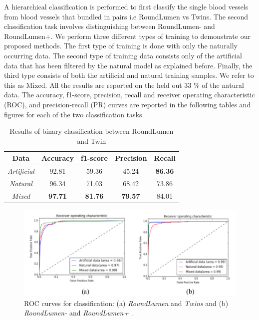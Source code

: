 A hierarchical classification is performed to first classify the single blood vessels from blood vessels that bundled in pairs i.e RoundLumen vs Twins. The second classification task involves distinguishing between RoundLumen- and RoundLumen+. We perform three different types of training to demonstrate our proposed methods. The first type of training is done with only the naturally occurring data. The second type of training data consists only of the artificial data that has been filtered by the natural model as explained before. Finally, the third type consists of both the artificial and natural training samples. We refer to this as Mixed. All the results are reported on the held out 33 \% of the natural data. The accuracy, f1-score, precision, recall and receiver operating characteristic (ROC), and precision-recall (PR) curves are reported in the following tables and figures for each of the two classification tasks. 

\begin{table}[H]
\label{table:results}
\centering
\caption{Results of binary classification between RoundLumen and Twin}
\begin{tabular}{ | c | c | c | c | c |} 
\hline
Data & Accuracy & f1-score & Precision & Recall \\ 
\hline
\textit{Artificial} & 92.81& 59.36	& 45.24 & \textbf{86.36} \\ 
\hline
\textit{Natural} & 96.34& 71.03& 68.42& 73.86 \\
\hline
\textit{Mixed} & \textbf{97.71} & \textbf{81.76} & \textbf{79.57} & 84.01 \\
\hline
\end{tabular}
\end{table}

\begin{figure}[H]
\centering
\includegraphics[width=1.0\textwidth]{img/results}
\caption{ROC curves for classification: (a) \textit{RoundLumen} and  \textit{Twins}  and (b) \textit{RoundLumen-} and \textit{RoundLumen+} .}
\label{fig:results}
\end{figure}


